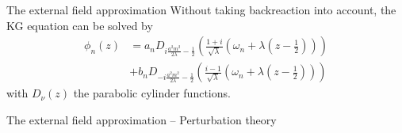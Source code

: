 \begin{frame}{The external field approximation}
	Without taking backreaction into account, the KG equation can be solved by
\begin{align*}
	\phi_n(z) &= 
	a_n D_{i \frac{a^2m^2}{2\lambda} - \frac{1}{2}} \left( 
		\frac{1+i}{\sqrt{\lambda} }
		\left( \omega_n + \lambda \left( z-\frac{1}{2} \right)
		\right) 
	\right) 
	\\
		  &+
	b_n D_{-i \frac{a^2m^2}{2\lambda} - \frac{1}{2}} \left( 
		\frac{i - 1}{\sqrt{\lambda} }
		\left( \omega_n + \lambda \left( z-\frac{1}{2} \right)
		\right) 
	\right)
	\label{eq:parabolyc-cylinder}
\end{align*}
with $D_\nu(z)$ the parabolic cylinder functions.
\end{frame}

\begin{frame}{The external field approximation -- Perturbation theory}

\end{frame}

